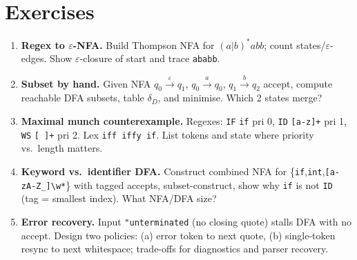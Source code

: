 \section{Exercises}
\label{sec:ch02-exercises}
\begin{enumerate}[label=E2.\arabic*, leftmargin=*, itemsep=0.8em]
\item \textbf{Regex to $\varepsilon$-NFA.} Build Thompson NFA for $(a|b)^*abb$; count states/$\varepsilon$-edges. Show $\varepsilon$-closure of start and trace \texttt{ababb}.
\item \textbf{Subset by hand.} Given NFA $q_0\xrightarrow{\varepsilon}q_1$, $q_0\xrightarrow{a}q_0$, $q_1\xrightarrow{b}q_2$ accept, compute reachable DFA subsets, table $\delta_D$, and minimise. Which 2 states merge?
\item \textbf{Maximal munch counterexample.} Regexes: \texttt{IF} \texttt{if} pri 0, \texttt{ID} \texttt{[a-z]+} pri 1, \texttt{WS} \texttt{[ ]+} pri 2. Lex \texttt{iff iffy if}. List tokens and state where priority vs.\ length matters.
\item \textbf{Keyword vs.\ identifier DFA.} Construct combined NFA for \{\texttt{if},\texttt{int},\texttt{[a-zA-Z\_]\textbackslash w*}\} with tagged accepts, subset-construct, show why \texttt{if} is not \texttt{ID} (tag = smallest index). What NFA/DFA size?
\item \textbf{Error recovery.} Input \texttt{"unterminated} (no closing quote) stalls DFA with no accept. Design two policies: (a) error token to next quote, (b) single-token resync to next whitespace; trade-offs for diagnostics and parser recovery.
\end{enumerate}
